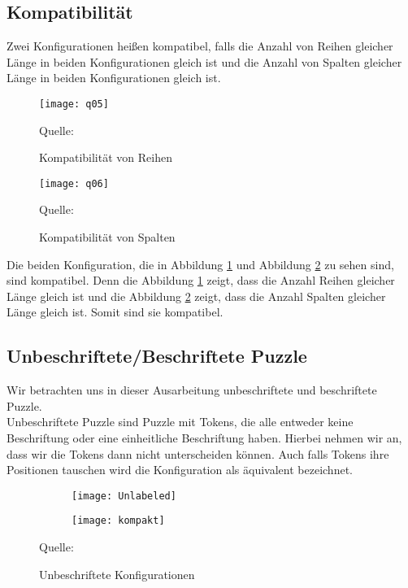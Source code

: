 \documentclass[seminar,german]{algothesis}
\newcommand*{\quelle}{%
  \footnotesize Quelle:
}
\begin{document}
\subsection{Kompatibilität}
\begin{definition}
Zwei Konfigurationen heißen kompatibel, falls die Anzahl von Reihen gleicher Länge in beiden Konfigurationen gleich ist und die Anzahl von Spalten gleicher Länge in beiden Konfigurationen gleich ist.
\end{definition}
\begin{figure}[ht]
	\centering
	\texttt{[image: q05]}
	\caption{Kompatibilität von Reihen}
	\quelle \cite{akitaya2022pushing}
	\label{fig:5.1}
\end{figure}
\begin{figure}[ht]
	\centering
	\texttt{[image: q06]}
	\caption{Kompatibilität von Spalten}
	\quelle \cite{akitaya2022pushing}
	\label{fig:5.2}
\end{figure}

\noindent Die beiden Konfiguration, die in Abbildung \ref{fig:5.1} und Abbildung \ref{fig:5.2} zu sehen sind, sind kompatibel. Denn die Abbildung \ref{fig:5.1} zeigt, dass die Anzahl Reihen gleicher Länge gleich ist und die Abbildung \ref{fig:5.2} zeigt, dass die Anzahl Spalten gleicher Länge gleich ist. Somit sind sie kompatibel.

\subsection{Unbeschriftete/Beschriftete Puzzle}
Wir betrachten uns in dieser Ausarbeitung unbeschriftete und beschriftete Puzzle.\\ Unbeschriftete Puzzle sind Puzzle mit Tokens, die alle entweder keine Beschriftung oder eine einheitliche Beschriftung haben. Hierbei nehmen wir an, dass wir die Tokens dann nicht unterscheiden können. Auch falls Tokens ihre Positionen tauschen wird die Konfiguration als äquivalent bezeichnet. 

\begin{figure}[ht]
	\centering
	\begin{subfigure}{.3\textwidth}
		\texttt{[image: Unlabeled]}
    \end{subfigure}%
    \begin{subfigure}{.3\textwidth}
		\texttt{[image: kompakt]}
    \end{subfigure}
    \caption{Unbeschriftete Konfigurationen}
	\quelle \cite{akitaya2022pushing}
	\label{fig:6}
\end{figure}
\end{document}
